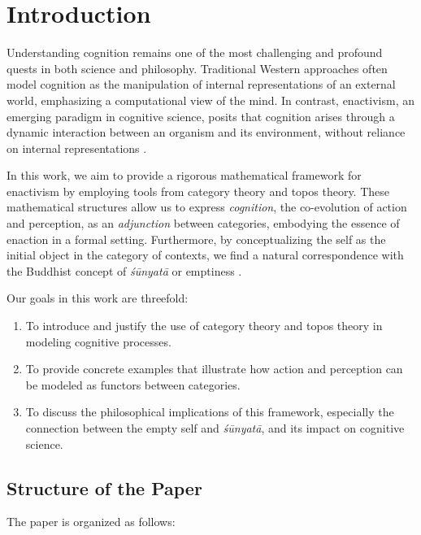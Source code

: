 \documentclass{article}
\begin{document}
\section{Introduction}

Understanding cognition remains one of the most challenging and profound quests in both science and philosophy. Traditional Western approaches often model cognition as the manipulation of internal representations of an external world, emphasizing a computational view of the mind. In contrast, enactivism, an emerging paradigm in cognitive science, posits that cognition arises through a dynamic interaction between an organism and its environment, without reliance on internal representations \cite{varela1991}.

In this work, we aim to provide a rigorous mathematical framework for enactivism by employing tools from category theory and topos theory. These mathematical structures allow us to express \emph{cognition}, the co-evolution of action and perception, as an \emph{adjunction} between categories, embodying the essence of enaction in a formal setting. Furthermore, by conceptualizing the self as the initial object in the category of contexts, we find a natural correspondence with the Buddhist concept of \emph{śūnyatā} or emptiness \cite{garfield1995}.

Our goals in this work are threefold:

\begin{enumerate}
    \item To introduce and justify the use of category theory and topos theory in modeling cognitive processes.
    \item To provide concrete examples that illustrate how action and perception can be modeled as functors between categories.
    \item To discuss the philosophical implications of this framework, especially the connection between the empty self and \emph{śūnyatā}, and its impact on cognitive science.

\end{enumerate}

\subsection{Structure of the Paper}

The paper is organized as follows:
\end{document}
